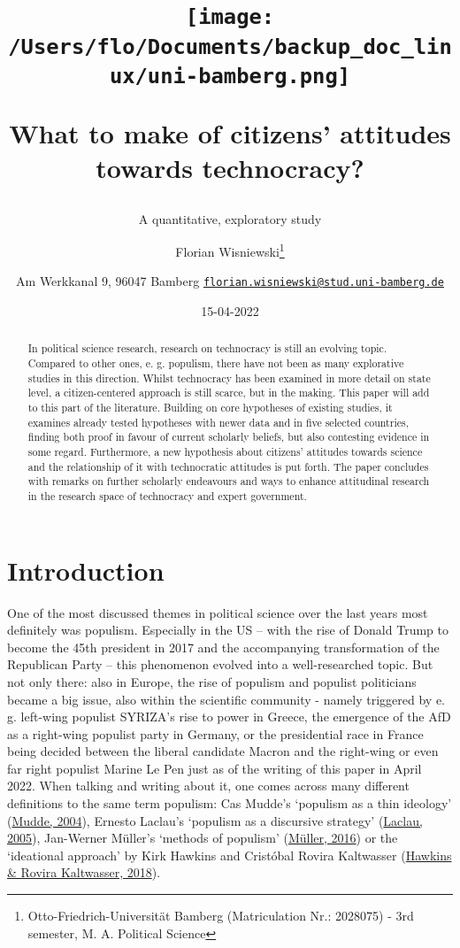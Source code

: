 \documentclass[
  12pt,
  english,
]{article}
\title{\texttt{[image: /Users/flo/Documents/backup\_doc\_linux/uni-bamberg.png]}

What to make of citizens' attitudes towards technocracy?}
\subtitle{A quantitative, exploratory study}
\author{Florian Wisniewski\footnote{Otto-Friedrich-Universität Bamberg
  (Matriculation Nr.: 2028075) - 3rd semester, M. A. Political Science} \and Am
Werkkanal 9, 96047 Bamberg \textbar{}
\href{mailto:florian.wisniewski@stud.uni-bamberg.de}{\nolinkurl{florian.wisniewski@stud.uni-bamberg.de}}}
\date{15-04-2022}
\begin{document}
\maketitle
\begin{abstract}
In political science research, research on technocracy is still an
evolving topic. Compared to other ones, e. g. populism, there have not
been as many explorative studies in this direction. Whilst technocracy
has been examined in more detail on state level, a citizen-centered
approach is still scarce, but in the making. This paper will add to this
part of the literature. Building on core hypotheses of existing studies,
it examines already tested hypotheses with newer data and in five
selected countries, finding both proof in favour of current scholarly
beliefs, but also contesting evidence in some regard. Furthermore, a new
hypothesis about citizens' attitudes towards science and the
relationship of it with technocratic attitudes is put forth. The paper
concludes with remarks on further scholarly endeavours and ways to
enhance attitudinal research in the research space of technocracy and
expert government.
\end{abstract}

\newpage{}

\tableofcontents

\newpage{}

\hypertarget{introduction}{%
\section{Introduction}\label{introduction}}

One of the most discussed themes in political science over the last
years most definitely was populism. Especially in the US -- with the
rise of Donald Trump to become the 45th president in 2017 and the
accompanying transformation of the Republican Party -- this phenomenon
evolved into a well-researched topic. But not only there: also in
Europe, the rise of populism and populist politicians became a big
issue, also within the scientific community - namely triggered by e. g.
left-wing populist SYRIZA's rise to power in Greece, the emergence of
the AfD as a right-wing populist party in Germany, or the presidential
race in France being decided between the liberal candidate Macron and
the right-wing or even far right populist Marine Le Pen just as of the
writing of this paper in April 2022. When talking and writing about it,
one comes across many different definitions to the same term populism:
Cas Mudde's `populism as a thin ideology'
(\protect\hyperlink{ref-mudde2004populist}{Mudde, 2004}), Ernesto
Laclau's `populism as a discursive strategy'
(\protect\hyperlink{ref-laclau2005populist}{Laclau, 2005}), Jan-Werner
Müller's `methods of populism'
(\protect\hyperlink{ref-muxfcller2016populismus}{Müller, 2016}) or the
`ideational approach' by Kirk Hawkins and Cristóbal Rovira Kaltwasser
(\protect\hyperlink{ref-hawkins2018ideational}{Hawkins \& Rovira
Kaltwasser, 2018}).
\end{document}
